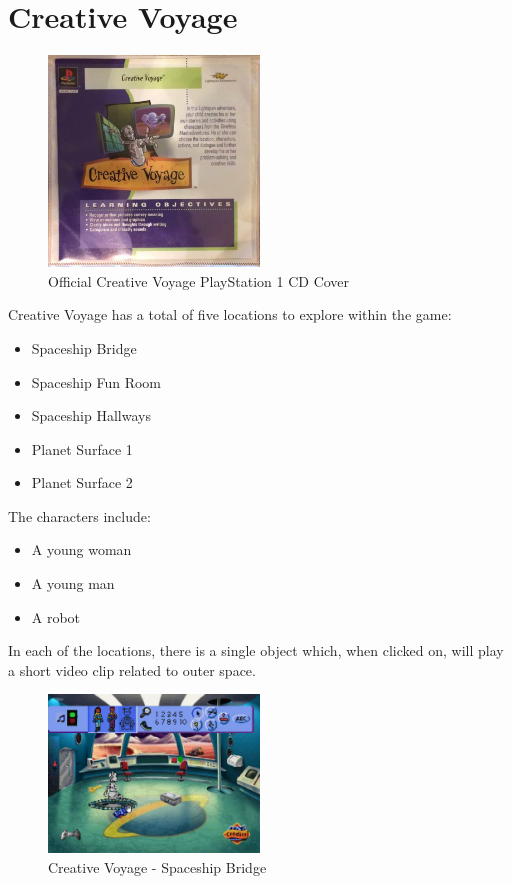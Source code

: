 \section{Creative Voyage}

\begin{figure}[H]
    \centering
    \includegraphics[width=0.5\textwidth]{"./Games/Creative/Images/CreativeVoyageCDCover.jpg"}
    \caption{Official Creative Voyage PlayStation 1 CD Cover}
\end{figure}

Creative Voyage has a total of five locations to explore within the game:

\begin{itemize}
    \item Spaceship Bridge
    \item Spaceship Fun Room
    \item Spaceship Hallways
    \item Planet Surface 1
    \item Planet Surface 2
\end{itemize}

The characters include:
\begin{itemize}
    \item A young woman
    \item A young man
    \item A robot
\end{itemize}

In each of the locations, there is a single object which, when clicked on, will play a short video clip related to outer space.

\begin{figure}[H]
    \centering
    \includegraphics[width=0.5\textwidth]{"./Games/Creative/Images/CreativeVoyageScreenshot1.jpg"}
    \caption{Creative Voyage - Spaceship Bridge}
\end{figure}

